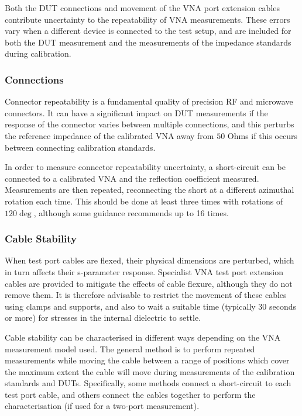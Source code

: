 \documentclass[../thesis/thesis.tex]{subfiles}
\begin{document}
\begin{refsection}
Both the DUT connections and movement of the VNA port extension cables contribute uncertainty to the repeatability of VNA measurements. These errors vary when a different device is connected to the test setup, and are included for both the DUT measurement and the measurements of the impedance standards during calibration.

\subsubsection{Connections}

Connector repeatability is a fundamental quality of precision RF and microwave connectors. It can have a significant impact on DUT measurements if the response of the connector varies between multiple connections, and this perturbs the reference impedance of the calibrated VNA away from $50$ Ohms if this occurs between connecting calibration standards.

In order to measure connector repeatability uncertainty, a short-circuit can be connected to a calibrated VNA and the reflection coefficient measured. Measurements are then repeated, reconnecting the short at a different azimuthal rotation each time. This should be done at least three times with rotations of $120\deg$, although some guidance recommends up to 16 times\cite{EURAMET_2011}.

\subsubsection{Cable Stability}

When test port cables are flexed, their physical dimensions are perturbed, which in turn affects their s-parameter response. Specialist VNA test port extension cables are provided to mitigate the effects of cable flexure, although they do not remove them. It is therefore advisable to restrict the movement of these cables using clamps and supports, and also to wait a suitable time (typically 30 seconds or more) for stresses in the internal dielectric to settle.

Cable stability can be characterised in different ways depending on the VNA measurement model used. The general method is to perform repeated measurements while moving the cable between a range of positions which cover the maximum extent the cable will move during measurements of the calibration standards and DUTs. Specifically, some methods connect a short-circuit to each test port cable, and others connect the cables together to perform the characterisation (if used for a two-port measurement).


\end{refsection}
\end{document}
